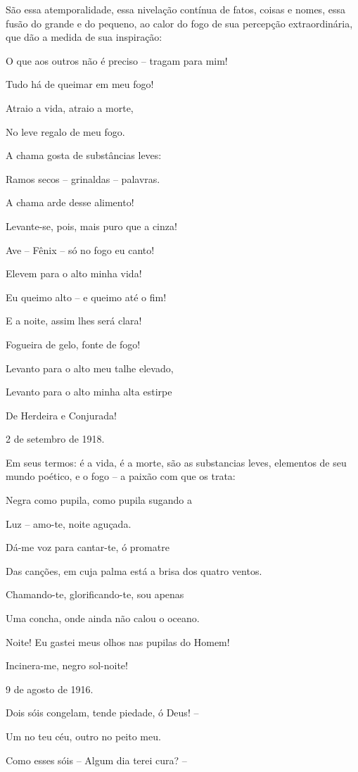 São essa atemporalidade, essa nivelação contínua de fatos, coisas e
nomes, essa fusão do grande e do pequeno, ao calor do fogo de sua
percepção extraordinária, que dão a medida de sua inspiração:

O que aos outros não é preciso -- tragam para mim!

Tudo há de queimar em meu fogo!

Atraio a vida, atraio a morte,

No leve regalo de meu fogo.

A chama gosta de substâncias leves:

Ramos secos -- grinaldas -- palavras.

A chama arde desse alimento!

Levante-se, pois, mais puro que a cinza!

Ave -- Fênix -- só no fogo eu canto!

Elevem para o alto minha vida!

Eu queimo alto -- e queimo até o fim!

E a noite, assim lhes será clara!

Fogueira de gelo, fonte de fogo!

Levanto para o alto meu talhe elevado,

Levanto para o alto minha alta estirpe

De Herdeira e Conjurada!

2 de setembro de 1918.

Em seus termos: é a vida, é a morte, são as substancias leves, elementos
de seu mundo poético, e o fogo -- a paixão com que os trata:

Negra como pupila, como pupila sugando a

Luz -- amo-te, noite aguçada.

Dá-me voz para cantar-te, ó promatre

Das canções, em cuja palma está a brisa dos quatro ventos.

Chamando-te, glorificando-te, sou apenas

Uma concha, onde ainda não calou o oceano.

Noite! Eu gastei meus olhos nas pupilas do Homem!

Incinera-me, negro sol-noite!

9 de agosto de 1916.

Dois sóis congelam, tende piedade, ó Deus! --

Um no teu céu, outro no peito meu.

Como esses sóis -- Algum dia terei cura? --

